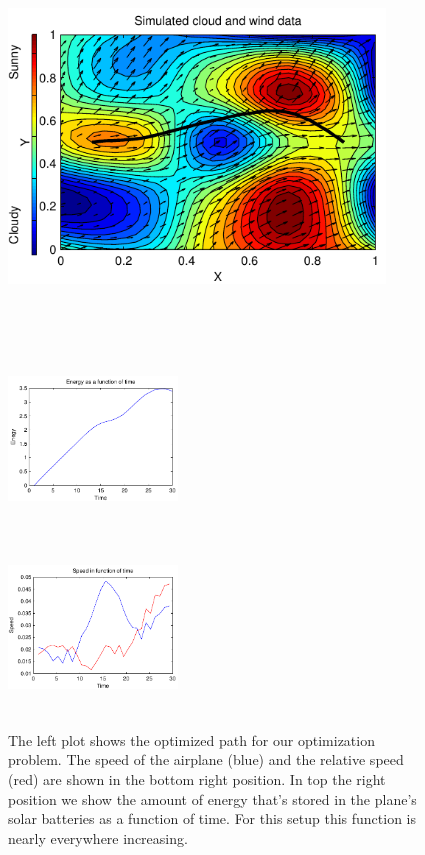 \begin{figure}[width=15cm]
\begin{minipage}[c][11cm][t]{0.5\textwidth}
  \vspace*{\fill}
  \centering
  \includegraphics[width=10cm,height=10cm]{../src/plot/fancy1/path}
  \label{fig:test1}
\end{minipage}%
\begin{minipage}[c][11cm][t]{.5\textwidth}
  \vspace*{\fill}
  \centering
  \includegraphics[width=4.5cm,height=4.5cm]{../src/plot/fancy1/Energy}
  \label{fig:test2}\par\vfill
  \includegraphics[width=4.5cm,height=4.5cm]{../src/plot/fancy1/speed}
  \label{fig:test3}
\end{minipage}
\caption{The left plot shows the optimized path for our optimization problem. The speed of the airplane (blue) and the relative speed (red) are shown in the bottom right position. In top the right position we show the amount of energy that's stored in the plane's solar batteries as a function of time. For this setup this function is nearly everywhere increasing.}
\label{fig:badPlot}
\end{figure}

